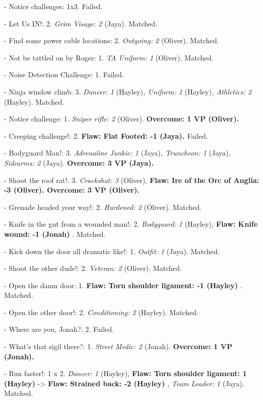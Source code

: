 \newpage
{} 


{
\parskip=0pt
- Notice challenges: 1x3.  Failed.

- Let Us IN!: 2.  \textit{Grim Visage: 2} (Jaya).  Matched. 

- Find some power cable locations: 2.  \textit{Outgoing: 2} (Oliver). Matched. 

- Not be tattled on by Roger: 1.  \textit{TA Uniform: 1} (Oliver). Matched.

- Noise Detection Challenge: 1. Failed.

- Ninja window climb: 3.  \textit{Dancer: 1 }(Hayley)\textit{, Uniform: 1} (Hayley)\textit{, Athletics: 2 }(Hayley). Matched.

- Notice challenge: 1.  \textit{Sniper rifle: 2} (Oliver). \textbf{ {\color[RGB]{0,0,255}Overcome: 1 VP (Oliver).} }

- Creeping challenge!: 2.  \textbf{ {\color[RGB]{255,0,0}Flaw: Flat Footed: -1 (Jaya). } }Failed.

- Bodyguard Man!: 3.  \textit{Adrenaline Junkie: 1} (Jaya)\textit{, Truncheon: 1} (Jaya)\textit{, Sidearms: 2} (Jaya). \textbf{ {\color[RGB]{0,0,255}Overcome: 3 VP (Jaya).} }

- Shoot the roof rat!: 3.  \textit{Crackshot: 3} (Oliver), \textbf{ {\color[RGB]{255,0,0}Flaw: Ire of the Orc of Anglia: -3 (Oliver). } }\textbf{ {\color[RGB]{0,0,255}Overcome: 3 VP (Oliver).} }

- Grenade headed your way!: 2.  \textit{Hardened: 2} (Oliver). Matched.

- Knife in the gut from a wounded man!: 2.  \textit{Bodyguard: 1} (Hayley), \textbf{ {\color[RGB]{255,0,0}Flaw: Knife wound: -1 (Jonah)} }. Matched. 

- Kick down the door all dramatic like!: 1. \textit{Outfit: 1} (Jaya). Matched.

- Shoot the other dude!: 2.  \textit{Veteran: 2} (Oliver). Matched. 

- Open the damn door: 1.  \textbf{ {\color[RGB]{255,0,0}Flaw: Torn shoulder ligament: -1 (Hayley)} }. Matched. 

- Open the other door!: 2.  \textit{Conditioning: 2} (Hayley). Matched. 

- Where are you, Jonah?: 2.  Failed.

- What's that sigil there?: 1. \textit{Street Medic: 2} (Jonah). \textbf{ {\color[RGB]{0,0,255}Overcome: 1 VP (Jonah).} }

- Run faster!: 1 x 2.  \textit{Dancer: 1} (Hayley), \textbf{ {\color[RGB]{255,0,0}Flaw: Torn shoulder ligament: 1 (Hayley)} } -\textgreater  \textbf{ {\color[RGB]{255,0,0}Flaw: Strained back: -2 (Hayley)} }, \textit{Team Leader: 1} (Jaya). Matched.

}
